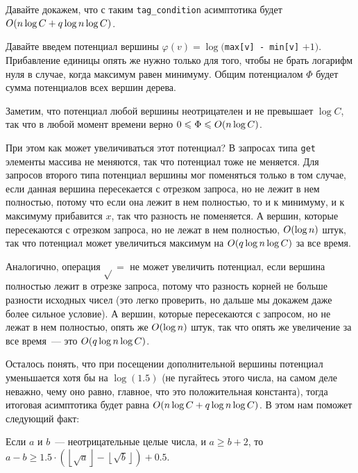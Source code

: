 Давайте докажем, что с таким \verb+tag_condition+ асимптотика будет $O(n \log C + q \log n \log C)$.

Давайте введем потенциал вершины $\varphi(v) = \log($\verb+max[v] - min[v]+ $+ 1)$. Прибавление единицы опять же нужно только для того, чтобы не брать логарифм нуля в случае, когда максимум равен минимуму.
Общим потенциалом $\Phi$ будет сумма потенциалов всех вершин дерева.

Заметим, что потенциал любой вершины неотрицателен и не превышает $\log C$, так что в любой момент времени верно $0 \leqslant \Phi \leqslant O(n \log C)$.

При этом как может увеличиваться этот потенциал? В запросах типа \verb+get+ элементы массива не меняются, так что потенциал тоже не меняется. Для запросов второго типа потенциал вершины мог поменяться только в том случае, если данная вершина пересекается с отрезком запроса, но не лежит в нем полностью, потому что если она лежит в нем полностью, то и к минимуму, и к максимуму прибавится $x$, так что разность не поменяется. А вершин, которые пересекаются с отрезком запроса, но не лежат в нем полностью, $O(\log n)$ штук, так что потенциал может увеличиться максимум на $O(q \log n \log C)$ за все время.

Аналогично, операция $\sqrt{}=$ не может увеличить потенциал, если вершина полностью лежит в отрезке запроса, потому что разность корней не больше разности исходных чисел (это легко проверить, но дальше мы докажем даже более сильное условие). А вершин, которые пересекаются с запросом, но не лежат в нем полностью, опять же $O(\log n)$ штук, так что опять же увеличение за все время~--- это $O(q \log n \log C)$.

Осталось понять, что при посещении дополнительной вершины потенциал уменьшается хотя бы на $\log (1.5)$ (не пугайтесь этого числа, на самом деле неважно, чему оно равно, главное, что это положительная константа), тогда итоговая асимптотика будет равна $O(n \log C + q \log n \log C)$. В этом нам поможет следующий факт:

\begin{theorem}
    Если $a$ и $b$~--- неотрицательные целые числа, и $a \ge b + 2$, то $a - b \ge 1.5 \cdot \left( \left\lfloor \sqrt{a} \right\rfloor - \left\lfloor \sqrt{b} \right\rfloor \right) + 0.5$.
\end{theorem}

